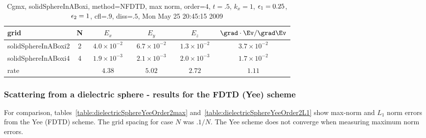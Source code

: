 \begin{table}[hbt]\tableFont %
\begin{center}
\begin{tabular}{|l|c|c|c|c|c|} \hline 
grid  & N &  $E_x$ &  $E_y$ & $E_z$ & $\grad\cdot\Ev/\grad\Ev$\\ \hline 
 solidSphereInABoxi2 &     2 & ~$4.0\times10^{ -2}$~ & ~$6.7\times10^{ -2}$~ & ~$1.3\times10^{ -2}$~ & ~$3.7\times10^{ -2}$~  \\ \hline
 solidSphereInABoxi4 &     4 & ~$1.9\times10^{ -3}$~ & ~$2.1\times10^{ -3}$~ & ~$2.0\times10^{ -3}$~ & ~$1.7\times10^{ -2}$~  \\ \hline
    rate             &       &       $4.38$          &       $5.02$          &       $2.72$          &       $1.11$           \\ \hline
\end{tabular}
\caption{Cgmx, solidSphereInABoxi, method=NFDTD, max norm, order=$4$, $t=.5$, $k_x=1$, $\epsilon_1=0.25$, $\epsilon_2=1$, cfl=$.9$, diss=$.5$, Mon May 25 20:45:15 2009}\label{table:dielectricSphereNFDTDOrder4max}
\end{center}
\end{table}

\clearpage
\subsubsection{Scattering from a dielectric sphere - results for the FDTD (Yee) scheme}
For comparison, tables~\ref{table:dielectricSphereYeeOrder2max}
and~\ref{table:dielectricSphereYeeOrder2L1} show max-norm and $L_1$ norm errors from the Yee (FDTD) scheme.
The grid spacing for case $N$ was $.1/N$. 
The Yee scheme does not converge when measuring maximum norm errors. 

